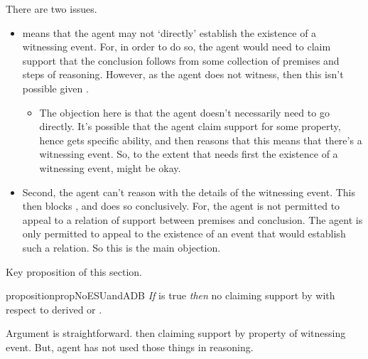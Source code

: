 \begin{note}
  \color{red}
  There are two issues.
  \begin{itemize}
  \item \ESU{} means that the agent may not `directly' establish the existence of a witnessing event.
    For, in order to do so, the agent would need to claim support that the conclusion follows from some collection of premises and steps of reasoning.
    However, as the agent does not witness, then this isn't possible given \ESU{}.
    \begin{itemize}
    \item The objection here is that the agent doesn't necessarily need to go directly.
      It's possible that the agent claim support for some property, hence gets specific ability, and then reasons that this means that there's a witnessing event.
      So, to the extent that \WR{} needs first the existence of a witnessing event, \ESU{} might be okay.
    \end{itemize}
  \item Second, the agent can't reason with the details of the witnessing event.
    This then blocks \WR{}, and does so conclusively.
    For, the agent is not permitted to appeal to a relation of support between premises and conclusion.
    The agent is only permitted to appeal to the existence of an event that would establish such a relation.
    So this is the main objection.
  \end{itemize}
\end{note}

Key proposition of this section.

\begin{note}[Proposition]
    \begin{restatable}{proposition}{propNoESUandADB}\label{mcA:WR-and-denied-claim}
    \emph{If} \ESU{} is true \emph{then} no claiming support by \adB{} with respect to derived \AR{} or \WR{}.
  \end{restatable}
\end{note}

\begin{note}
  Argument is straightforward.
  \adB{} then claiming support by property of witnessing event.
  But, agent has not used those things in reasoning.
\end{note}

